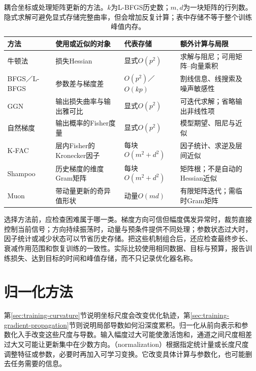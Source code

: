 \begin{table}[htbp]
  \centering\small
  \begin{tabularx}{\linewidth}{@{}p{27mm}p{43mm}p{31mm}X@{}}
    \toprule
    方法 & 使用或近似的对象 & 代表存储 & 额外计算与局限 \\
    \midrule
    牛顿法 & 损失Hessian & 显式$O(p^2)$ & 求解与阻尼；可用矩阵--向量乘积 \\
    BFGS／L-BFGS & 参数差与梯度差 & $O(p^2)$／$O(kp)$ & 割线信息、线搜索及噪声敏感性 \\
    GGN & 输出损失曲率与输出雅可比 & 显式$O(p^2)$ & 可迭代求解；省略输出非线性项 \\
    自然梯度 & 输出概率的Fisher度量 & 显式$O(p^2)$ & 模型期望、阻尼与近似 \\
    K-FAC & 层内Fisher的Kronecker因子 & 每块$O(m^2+d^2)$ & 因子统计、求逆及层间近似 \\
    Shampoo & 历史梯度的维度Gram矩阵 & 每块$O(m^2+d^2)$ & 矩阵根；不是自动的Hessian近似 \\
    Muon & 带动量更新的奇异值形状 & 动量$O(md)$ & 有限矩阵迭代；需临时Gram矩阵 \\
    \bottomrule
  \end{tabularx}
  \caption{耦合坐标或处理矩阵更新的方法。$k$为L-BFGS历史数；$m,d$为一块矩阵的行列数。隐式求解可避免显式存储完整曲率，但会增加反复计算；表中存储不等于整个训练峰值内存。}
  \label{tab:training-matrix-comparison}
\end{table}
\FloatBarrier

选择方法前，应检查困难属于哪一类。梯度方向可信但幅度偶发异常时，裁剪直接控制当前信号；方向持续振荡时，动量与预条件提供不同处理；参数状态过大时，因子统计或减少状态可以节省历史存储。把这些机制组合后，还应检查最终步长、衰减作用范围和恢复训练的一致性。实际比较使用相同数据、目标与预算，报告训练损失、达到目标的时间和峰值存储，而不只记录优化器名称。

\section{归一化方法}
\label{sec:training-normalization}
第\ref{sec:training-curvature}节说明坐标尺度会改变优化轨迹，第\ref{sec:training-gradient-propagation}节则说明局部导数如何沿深度累积。归一化从前向表示和参数化入手改变这些尺度与导数。输入幅度过大可能使激活饱和，通道之间尺度相差过大又可能让更新集中在少数方向。（normalization）根据指定统计量或长度尺度调整特征或参数，必要时再加入可学习变换。它改变具体计算与参数化，也可能删去任务需要的信息。

